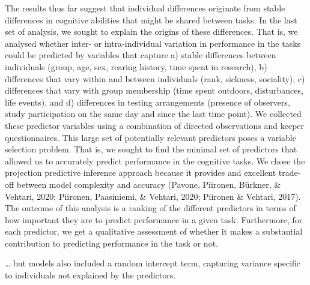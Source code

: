 \documentclass[
  man,floatsintext]{apa6}
\begin{document}
The results thus far suggest that individual differences originate from stable differences in cognitive abilities that might be shared between tasks. In the last set of analysis, we sought to explain the origins of these differences. That is, we analysed whether inter- or intra-individual variation in performance in the tasks could be predicted by variables that capture a) stable differences between individuals (group, age, sex, rearing history, time spent in research), b) differences that vary within and between individuals (rank, sickness, sociality), c) differences that vary with group membership (time spent outdoors, disturbances, life events), and d) differences in testing arrangements (presence of observers, study participation on the same day and since the last time point). We collected these predictor variables using a combination of directed observations and keeper questionnaires. This large set of potentially relevant predictors poses a variable selection problem. That is, we sought to find the minimal set of predictors that allowed us to accurately predict performance in the cognitive tasks. We chose the projection predictive inference approach because it provides and excellent trade-off between model complexity and accuracy (Pavone, Piironen, Bürkner, \& Vehtari, 2020; Piironen, Paasiniemi, \& Vehtari, 2020; Piironen \& Vehtari, 2017). The outcome of this analysis is a ranking of the different predictors in terms of how important they are to predict performance in a given task. Furthermore, for each predictor, we get a qualitative assessment of whether it makes a substantial contribution to predicting performance in the task or not.

\ldots{} but models also included a random intercept term, capturing variance specific to individuals not explained by the predictors.
\end{document}
